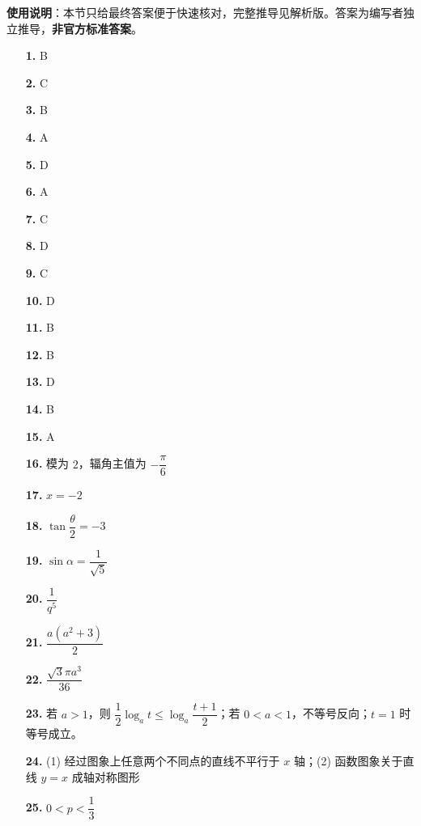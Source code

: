 
\begin{gknotice}
\textbf{使用说明}：本节只给最终答案便于快速核对，完整推导见解析版。答案为编写者独立推导，\textbf{非官方标准答案}。
\end{gknotice}

\begin{itemize}[leftmargin=2.6em]
  \item[\textbf{1.}] B
  \item[\textbf{2.}] C
  \item[\textbf{3.}] B
  \item[\textbf{4.}] A
  \item[\textbf{5.}] D
  \item[\textbf{6.}] A
  \item[\textbf{7.}] C
  \item[\textbf{8.}] D
  \item[\textbf{9.}] C
  \item[\textbf{10.}] D
  \item[\textbf{11.}] B
  \item[\textbf{12.}] B
  \item[\textbf{13.}] D
  \item[\textbf{14.}] B
  \item[\textbf{15.}] A
  \item[\textbf{16.}] 模为 $2$，辐角主值为 $-\dfrac\pi6$
  \item[\textbf{17.}] $x=-2$
  \item[\textbf{18.}] $\tan\dfrac\theta2=-3$
  \item[\textbf{19.}] $\sin\alpha=\dfrac1{\sqrt5}$
  \item[\textbf{20.}] $\dfrac1{q^5}$
  \item[\textbf{21.}] $\dfrac{a(a^2+3)}2$
  \item[\textbf{22.}] $\dfrac{\sqrt3\pi a^3}{36}$
  \item[\textbf{23.}] 若 $a>1$，则 $\dfrac12\log_a t\leq\log_a\dfrac{t+1}{2}$；若 $0<a<1$，不等号反向；$t=1$ 时等号成立。
  \item[\textbf{24.}] (1) 经过图象上任意两个不同点的直线不平行于 $x$ 轴；(2) 函数图象关于直线 $y=x$ 成轴对称图形
  \item[\textbf{25.}] $0<p<\dfrac13$
\end{itemize}
